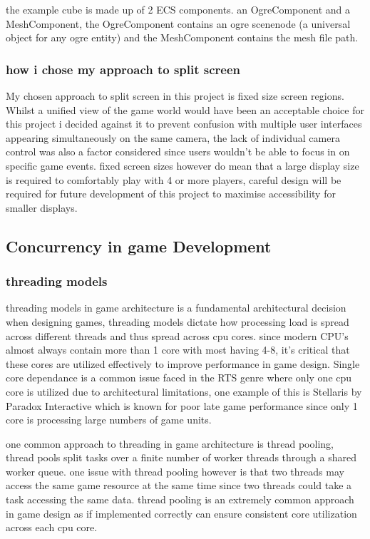 \documentclass[]{final_report}
\begin{document}
the example cube is made up of 2 ECS components. an OgreComponent and a MeshComponent, the OgreComponent contains an ogre scenenode (a universal object for any ogre entity) and the MeshComponent contains the mesh file path.
\subsubsection{how i chose my approach to split screen}
My chosen approach to split screen in this project is fixed size screen regions. Whilst a unified view of the game world would have been an acceptable choice for this project i decided against it to prevent confusion with multiple user interfaces appearing simultaneously on the same camera, the lack of individual camera control was also a factor considered since users wouldn't be able to focus in on specific game events. fixed screen sizes however do mean that a large display size is required to comfortably play with 4 or more players, careful design will be required for future development of this project to maximise accessibility for smaller displays.

\subsection{Concurrency in game Development}
\subsubsection{threading models}
threading models in game architecture is a fundamental architectural decision when designing games, threading models dictate how processing load is spread across different threads and thus spread across cpu cores. since modern CPU's almost always contain more than 1 core with most having 4-8, it's critical that these cores are utilized effectively to improve performance in game design. Single core dependance is a common issue faced in the RTS genre where only one cpu core is utilized due to architectural limitations, one example of this is Stellaris by Paradox Interactive which is known for poor late game performance since only 1 core is processing large numbers of game units.

one common approach to threading in game architecture is thread pooling, thread pools split tasks over a finite number of worker threads through a shared worker queue. one issue with thread pooling however is that two threads may access the same game resource at the same time since two threads could take a task accessing the same data. thread pooling is an extremely common approach in game design as if implemented correctly can ensure consistent core utilization across each cpu core.
\end{document}
